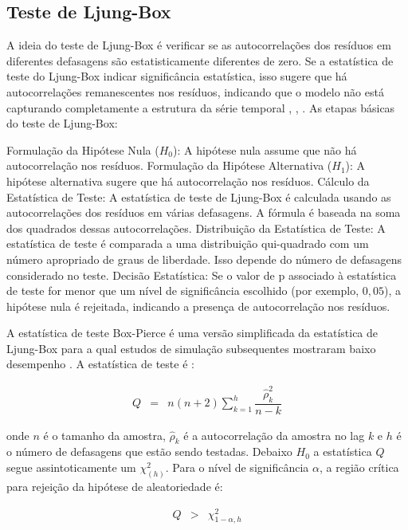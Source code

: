  \subsection{Teste de Ljung-Box}
 
A ideia do teste de Ljung-Box é verificar se as autocorrelações dos resíduos em diferentes defasagens são estatisticamente diferentes de zero. Se a estatística de teste do Ljung-Box indicar significância estatística, isso sugere que há autocorrelações remanescentes nos resíduos, indicando que o modelo não está capturando completamente a estrutura da série temporal \cite{box}, \cite{ljung}, \cite{dav}. As etapas básicas do teste de Ljung-Box:

Formulação da Hipótese Nula ($H_0$): A hipótese nula assume que não há autocorrelação nos resíduos.
Formulação da Hipótese Alternativa ($H_1$): A hipótese alternativa sugere que há autocorrelação nos resíduos.
Cálculo da Estatística de Teste: A estatística de teste de Ljung-Box é calculada usando as autocorrelações dos resíduos em várias defasagens. A fórmula é baseada na soma dos quadrados dessas autocorrelações.
Distribuição da Estatística de Teste: A estatística de teste é comparada a uma distribuição qui-quadrado com um número apropriado de graus de liberdade. Isso depende do número de defasagens considerado no teste.
Decisão Estatística: Se o valor de p associado à estatística de teste for menor que um nível de significância escolhido (por exemplo, $0,05$), a hipótese nula é rejeitada, indicando a presença de autocorrelação nos resíduos.
 
A estatística de teste Box-Pierce é uma versão simplificada da estatística de Ljung-Box para a qual estudos de simulação subsequentes mostraram baixo desempenho \cite{dav}. A estatística de teste é \cite{ljung}:
 
 \begin{eqnarray}
 	Q&=&n(n+2) \sum_{k=1}^h \dfrac{\hat{\rho}_k^2}{n-k}
 \end{eqnarray}
 
\noindent onde $n$ é o tamanho da amostra, $\hat{\rho}_k$ é a autocorrelação da amostra no lag $k$ e $h$ é o número de defasagens que estão sendo testadas. Debaixo $H_0$ a estatística $Q$ segue assintoticamente um $\chi_{(h)}^2$. Para o nível de significância $\alpha$, a região crítica para rejeição da hipótese de aleatoriedade é:
 
\begin{eqnarray}
 	Q&>&\chi_{1-\alpha, h}^2
\end{eqnarray}
 
